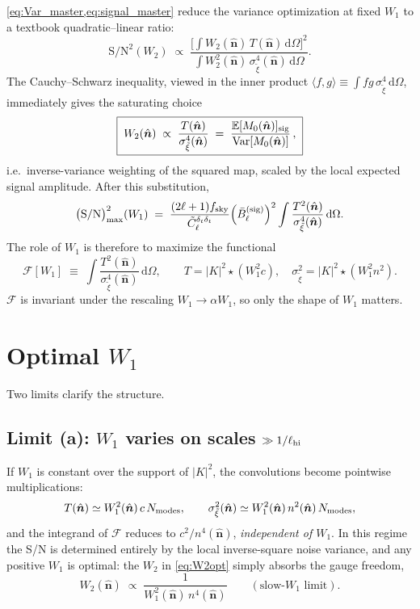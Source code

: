 \documentclass[11pt]{article}
\newcommand{\nv}{\hat{\boldsymbol{n}}}
\newcommand{\dom}{\mathrm{d}\Omega}
\newcommand{\E}{\mathbb{E}}
\newcommand{\Var}{\mathrm{Var}}
\newcommand{\deltat}{\delta_t}
\newcommand{\Nmodes}{N_{\rm modes}}
\newcommand{\Wone}{W_1}
\newcommand{\Wtwo}{W_2}
\begin{document}
\cref{eq:Var_master,eq:signal_master} reduce the variance optimization at
fixed $\Wone$ to a textbook quadratic--linear ratio:
\begin{equation}
\mathrm{S/N}^2(\Wtwo)\;\propto\;
\frac{\bigl[\int\Wtwo(\nv)\,T(\nv)\,\dom\bigr]^2}
     {\int\Wtwo^2(\nv)\,\sigma^4_{\tilde\xi}(\nv)\,\dom}.
\label{eq:SoNW2}
\end{equation}
The Cauchy--Schwarz inequality, viewed in the inner product
$\langle f,g\rangle\equiv\int fg\,\sigma^4_{\tilde\xi}\,\dom$, immediately
gives the saturating choice
\begin{equation}
\boxed{\;
\Wtwo(\nv)\;\propto\;\frac{T(\nv)}{\sigma^4_{\tilde\xi}(\nv)}
\;=\;\frac{\E[M_0(\nv)]_{\rm sig}}{\Var[M_0(\nv)]}\,,
\;}
\label{eq:W2opt}
\end{equation}
i.e.\ inverse-variance weighting of the squared map, scaled by the local
expected signal amplitude. After this substitution,
\begin{equation}
\bigl(\mathrm{S/N}\bigr)^2_{\max}(\Wone)\;=\;\frac{(2\ell+1)f_{\rm sky}}{\tilde C^{\deltat\deltat}_\ell}
\Bigl(\bar B_\ell^{(\rm sig)}\Bigr)^2
\int\frac{T^2(\nv)}{\sigma^4_{\tilde\xi}(\nv)}\,\dom .
\label{eq:SoNW1}
\end{equation}
The role of $\Wone$ is therefore to maximize the functional
\begin{equation}
\mathcal F[\Wone]\;\equiv\;\int\frac{T^2(\nv)}{\sigma^4_{\tilde\xi}(\nv)}\,\dom,
\qquad
T=|K|^2\star(\Wone^2 c),\quad
\sigma^2_{\tilde\xi}=|K|^2\star(\Wone^2 n^2).
\label{eq:F}
\end{equation}
$\mathcal F$ is invariant under the rescaling $\Wone\to\alpha\Wone$, so only
the shape of $\Wone$ matters.

\section{Optimal $\Wone$}

Two limits clarify the structure.

\subsection{Limit (a): $\Wone$ varies on scales $\gg 1/\ell_{\rm hi}$}

If $\Wone$ is constant over the support of $|K|^2$, the convolutions become
pointwise multiplications:
\begin{equation}
T(\nv)\simeq \Wone^2(\nv)\,c\,\Nmodes,\qquad
\sigma^2_{\tilde\xi}(\nv)\simeq \Wone^2(\nv)\,n^2(\nv)\,\Nmodes,
\end{equation}
and the integrand of $\mathcal F$ reduces to $c^2/n^4(\nv)$, \emph{independent
of $\Wone$}. In this regime the S/N is determined entirely by the local
inverse-square noise variance, and any positive $\Wone$ is optimal: the
$\Wtwo$ in \cref{eq:W2opt} simply absorbs the gauge freedom,
\begin{equation}
\Wtwo(\nv)\;\propto\;\frac{1}{\Wone^2(\nv)\,n^4(\nv)}\qquad
(\text{slow-}\Wone\text{ limit}).
\end{equation}
\end{document}
